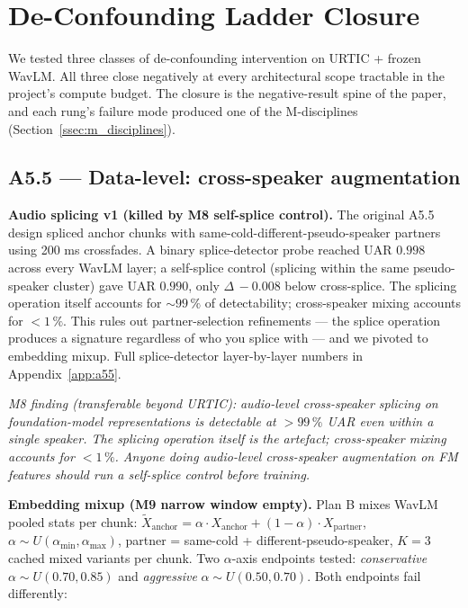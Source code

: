 \section{De-Confounding Ladder Closure}
\label{sec:deconf}

We tested three classes of de-confounding intervention on URTIC + frozen WavLM. All three close negatively at every architectural scope tractable in the project's compute budget. The closure is the negative-result spine of the paper, and each rung's failure mode produced one of the M-disciplines (Section~\ref{ssec:m_disciplines}).

\subsection{A5.5 --- Data-level: cross-speaker augmentation}
\label{ssec:a5_5}

\textbf{Audio splicing v1 (killed by M8 self-splice control).} The original A5.5 design spliced anchor chunks with same-cold-different-pseudo-speaker partners using 200 ms crossfades. A binary splice-detector probe reached UAR $0.998$ across every WavLM layer; a self-splice control (splicing within the same pseudo-speaker cluster) gave UAR $0.990$, only $\Delta\,-0.008$ below cross-splice. The splicing operation itself accounts for $\sim 99\,\%$ of detectability; cross-speaker mixing accounts for $<1\,\%$. This rules out partner-selection refinements --- the splice operation produces a signature regardless of who you splice with --- and we pivoted to embedding mixup. Full splice-detector layer-by-layer numbers in Appendix~\ref{app:a55}.

\textit{M8 finding (transferable beyond URTIC):} \emph{audio-level cross-speaker splicing on foundation-model representations is detectable at $>99\,\%$ UAR even within a single speaker. The splicing operation itself is the artefact; cross-speaker mixing accounts for $<1\,\%$. Anyone doing audio-level cross-speaker augmentation on FM features should run a self-splice control before training.}

\textbf{Embedding mixup (M9 narrow window empty).} Plan B mixes WavLM pooled stats per chunk: $\tilde{X}_{\text{anchor}} = \alpha \cdot X_{\text{anchor}} + (1-\alpha) \cdot X_{\text{partner}}$, $\alpha \sim U(\alpha_{\min}, \alpha_{\max})$, partner = same-cold + different-pseudo-speaker, $K{=}3$ cached mixed variants per chunk. Two $\alpha$-axis endpoints tested: \emph{conservative} $\alpha \sim U(0.70, 0.85)$ and \emph{aggressive} $\alpha \sim U(0.50, 0.70)$. Both endpoints fail differently:

